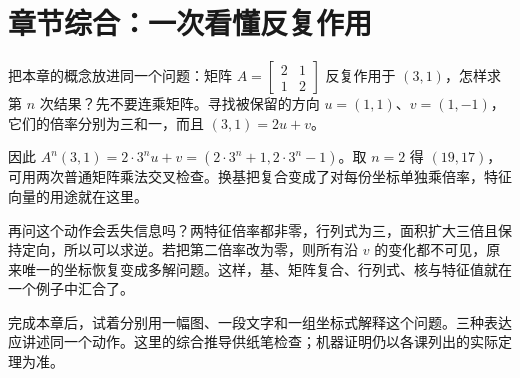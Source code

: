 \section*{章节综合：一次看懂反复作用}
把本章的概念放进同一个问题：矩阵 $A=\left[\begin{smallmatrix}2&1\\1&2\end{smallmatrix}\right]$ 反复作用于 $(3,1)$，怎样求第 $n$ 次结果？先不要连乘矩阵。寻找被保留的方向 $u=(1,1)$、$v=(1,-1)$，它们的倍率分别为三和一，而且 $(3,1)=2u+v$。

因此 $A^n(3,1)=2\cdot3^n u+v=(2\cdot3^n+1,2\cdot3^n-1)$。取 $n=2$ 得 $(19,17)$，可用两次普通矩阵乘法交叉检查。换基把复合变成了对每份坐标单独乘倍率，特征向量的用途就在这里。

再问这个动作会丢失信息吗？两特征倍率都非零，行列式为三，面积扩大三倍且保持定向，所以可以求逆。若把第二倍率改为零，则所有沿 $v$ 的变化都不可见，原来唯一的坐标恢复变成多解问题。这样，基、矩阵复合、行列式、核与特征值就在一个例子中汇合了。

完成本章后，试着分别用一幅图、一段文字和一组坐标式解释这个问题。三种表达应讲述同一个动作。这里的综合推导供纸笔检查；机器证明仍以各课列出的实际定理为准。
